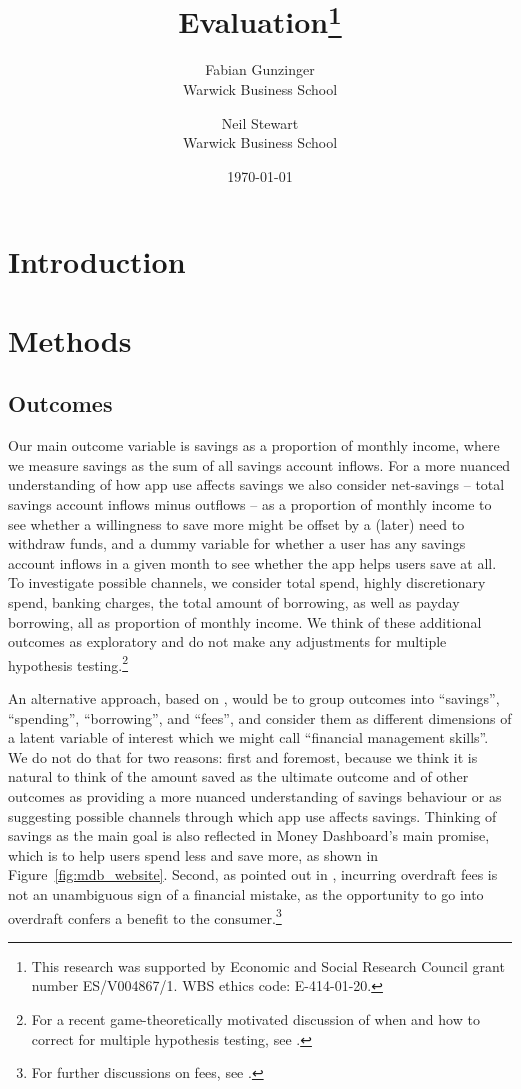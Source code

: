 \documentclass[a4paper, 11pt]{article}
\title{\textbf{Evaluation\footnote{This research was supported by Economic and Social Research Council grant number ES/V004867/1. WBS ethics code: E-414-01-20.}}}
\author{
    Fabian Gunzinger \\ Warwick Business School
    \and
    Neil Stewart \\ Warwick Business School
}
\date{\today}
\begin{document}
\maketitle
% 

\tableofcontents
\newpage

% 
\section{Introduction}%
\label{sec:introduction}


% 
\section{Methods}%
\label{sec:data}

\subsection{Outcomes}%
\label{sub:outcomes}

Our main outcome variable is savings as a proportion of monthly income, where
we measure savings as the sum of all savings account inflows. For a more
nuanced understanding of how app use affects savings we also consider net-savings --
total savings account inflows minus outflows -- as a proportion of monthly
income to see whether a willingness to save more might be offset by a (later)
need to withdraw funds, and a dummy variable for whether a user has any savings
account inflows in a given month to see whether the app helps users save at
all. To investigate possible channels, we consider total spend, highly
discretionary spend, banking charges, the total amount of borrowing, as well as
payday borrowing, all as proportion of monthly income. We think of these
additional outcomes as exploratory and do not make any adjustments for multiple
hypothesis testing.\footnote{For a recent game-theoretically motivated
discussion of when and how to correct for multiple hypothesis testing, see
\citet{viviano2021should}.}

An alternative approach, based on \citet{anderson2008multiple}, would be to
group outcomes into ``savings'', ``spending'', ``borrowing'', and ``fees'', and
consider them as different dimensions of a latent variable of interest which we
might call ``financial management skills''. We do not do that for two reasons:
first and foremost, because we think it is natural to think of the amount saved
as the ultimate outcome and of other outcomes as providing a more nuanced
understanding of savings behaviour or as suggesting possible channels through
which app use affects savings. Thinking of savings as the main goal is also
reflected in Money Dashboard's main promise, which is to help users spend less
and save more, as shown in Figure~\ref{fig:mdb_website}. Second, as pointed out
in \citet{carlin2017fintech}, incurring overdraft fees is not an unambiguous
sign of a financial mistake, as the opportunity to go into overdraft confers a
benefit to the consumer.\footnote{For further discussions on fees, see
\citet{jorring2020financial, stango2009consumers}.}
\end{document}
